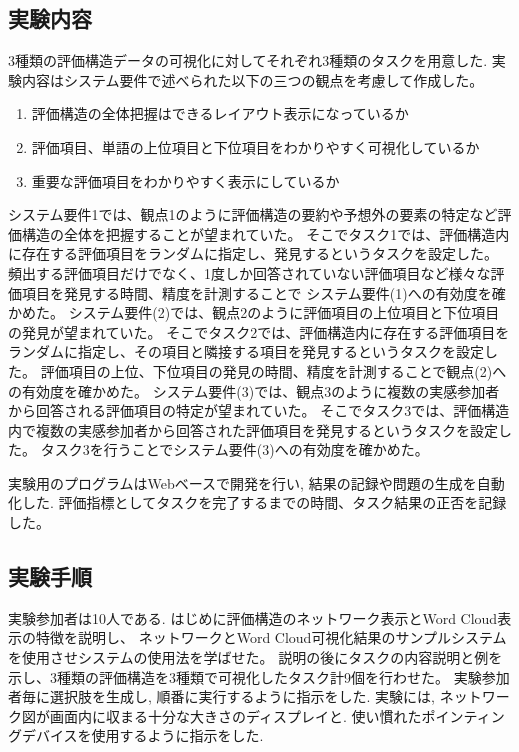\documentclass[syuuron]{kuee}
\begin{document}
		\subsection{実験内容}
			3種類の評価構造データの可視化に対してそれぞれ3種類のタスクを用意した. 
			実験内容はシステム要件で述べられた以下の三つの観点を考慮して作成した。
			\begin{enumerate}
				\item 評価構造の全体把握はできるレイアウト表示になっているか
				\item 評価項目、単語の上位項目と下位項目をわかりやすく可視化しているか
				\item 重要な評価項目をわかりやすく表示にしているか
			\end{enumerate}

			システム要件1では、観点1のように評価構造の要約や予想外の要素の特定など評価構造の全体を把握することが望まれていた。
			そこでタスク1では、評価構造内に存在する評価項目をランダムに指定し、発見するというタスクを設定した。
			頻出する評価項目だけでなく、1度しか回答されていない評価項目など様々な評価項目を発見する時間、精度を計測することで
			システム要件(1)への有効度を確かめた。
			システム要件(2)では、観点2のように評価項目の上位項目と下位項目の発見が望まれていた。
			そこでタスク2では、評価構造内に存在する評価項目をランダムに指定し、その項目と隣接する項目を発見するというタスクを設定した。
			評価項目の上位、下位項目の発見の時間、精度を計測することで観点(2)への有効度を確かめた。
			システム要件(3)では、観点3のように複数の実感参加者から回答される評価項目の特定が望まれていた。
			そこでタスク3では、評価構造内で複数の実感参加者から回答された評価項目を発見するというタスクを設定した。
			タスク3を行うことでシステム要件(3)への有効度を確かめた。
			
			実験用のプログラムはWebベースで開発を行い, 結果の記録や問題の生成を自動化した. 
			評価指標としてタスクを完了するまでの時間、タスク結果の正否を記録した。
		
		\subsection{実験手順}
			実験参加者は10人である. 
			はじめに評価構造のネットワーク表示とWord Cloud表示の特徴を説明し、
			ネットワークとWord Cloud可視化結果のサンプルシステムを使用させシステムの使用法を学ばせた。
			説明の後にタスクの内容説明と例を示し、3種類の評価構造を3種類で可視化したタスク計9個を行わせた。
			実験参加者毎に選択肢を生成し, 順番に実行するように指示をした. 
			実験には, ネットワーク図が画面内に収まる十分な大きさのディスプレイと. 使い慣れたポインティングデバイスを使用するように指示をした. 
		
\end{document}

